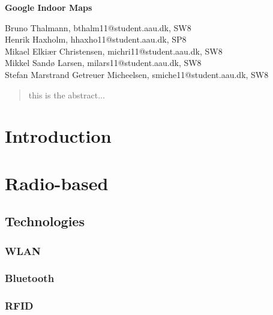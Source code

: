 \documentclass[12pt,a4paper]{article}
\begin{document}
\begin{center}
\bigskip\bigskip
{\Large\bf Google Indoor Maps}
\bigskip\bigskip


Bruno Thalmann, bthalm11@student.aau.dk, SW8\\
Henrik Haxholm, hhaxho11@student.aau.dk, SP8\\
Mikael Elkiær Christensen, michri11@student.aau.dk, SW8\\
Mikkel Sandø Larsen, milars11@student.aau.dk, SW8\\
Stefan Marstrand Getreuer Micheelsen, smiche11@student.aau.dk, SW8

\bigskip
\begin{abstract}
this is the abstract...
\end{abstract}

\thispagestyle{empty}
\end{center}


\titlepage



\thispagestyle{plain}


\section{Introduction}


\section{Radio-based}

\subsection{Technologies}

\subsubsection{WLAN}

\subsubsection{Bluetooth}

\subsubsection{RFID}

\end{document}
